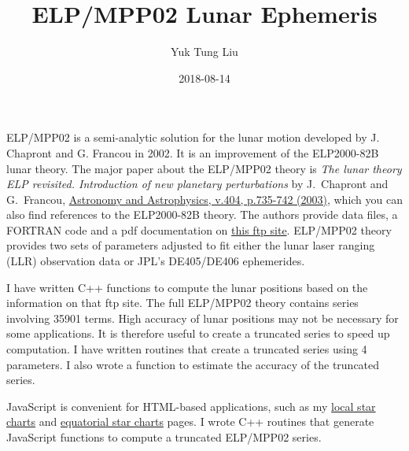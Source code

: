 \documentclass[12pt]{article}
\begin{document}
\title{ELP/MPP02 Lunar Ephemeris}
\author{Yuk Tung Liu}
\date{2018-08-14}
\maketitle

ELP/MPP02 is a semi-analytic solution for the lunar motion developed by 
J. Chapront and G. Francou in 2002. It is an improvement of the ELP2000-82B 
lunar theory. The major paper about the ELP/MPP02 theory is 
{\it The lunar theory ELP revisited. 
Introduction of new planetary perturbations} by J.\ Chapront and G.\ Francou, 
\href{http://adsabs.harvard.edu/abs/2003A%26A...404..735C}{Astronomy and Astrophysics, 
v.404, p.735-742 (2003)}, which you can also find references to the ELP2000-82B 
theory. The authors provide data files, a FORTRAN code and a 
pdf documentation on \href{ftp://cyrano-se.obspm.fr/pub/2_lunar_solutions/2_elpmpp02/}{this 
ftp site}. ELP/MPP02 theory provides two sets of parameters adjusted to fit 
either the lunar laser ranging (LLR) observation data or JPL's DE405/DE406 
ephemerides.

I have written C++ functions to compute the lunar positions based on  
the information on that ftp site. The full ELP/MPP02 theory contains 
series involving 35901 terms. High accuracy of lunar positions 
may not be necessary for some applications. It is therefore useful to create 
a truncated series to speed up computation. I have written routines 
that create a truncated series using 4 parameters. I 
also wrote a function to estimate the accuracy of the truncated series. 

JavaScript is convenient for HTML-based applications, such as my
\href{https://ytliu0.github.io/starCharts/}{local star charts} and
\href{https://ytliu0.github.io/starCharts/chartGCRS_min.html}{equatorial star
charts} pages. I wrote C++ routines that generate JavaScript functions to compute a truncated ELP/MPP02 series.
\end{document}
